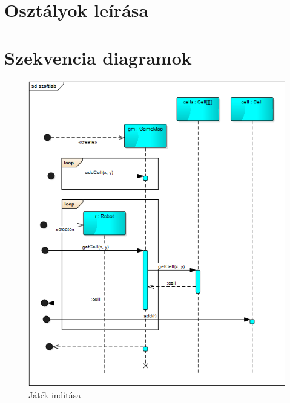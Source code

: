 \section{Osztályok leírása}


\clearpage
\section{Szekvencia diagramok}


\begin{figure}[!htbp]
	\begin{center}
		\includegraphics[width=166mm, center]{./vegleges_statikus_seq/GameMap.png}
		\caption{Játék indítása}
	\end{center}
\end{figure}

